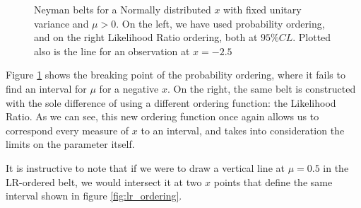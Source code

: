 \begin{example}
	\begin{figure}[H]
		\centering
		
		\caption{Neyman belts for a Normally distributed $x$ with fixed unitary variance and $\mu>0$. On the left, we have used probability ordering, and on the right Likelihood Ratio ordering, both at $95\% CL$. Plotted also is the line for an observation at $x=-2.5$}
		\label{fig:neyman_gauss_limited}
	\end{figure}
	
	Figure \ref{fig:neyman_gauss_limited} shows the breaking point of the probability ordering, where it fails to find an interval for $\mu$ for a negative $x$. On the right, the same belt is constructed with the sole difference of using a different ordering function: the Likelihood Ratio. As we can see, this new ordering function once again allows us to correspond every measure of $x$ to an interval, and takes into consideration the limits on the parameter itself. 
	
	It is instructive to note that if we were to draw a vertical line at $\mu=0.5$ in the LR-ordered belt, we would intersect it at two $x$ points that define the same interval shown in figure \ref{fig:lr_ordering}.
\end{example}

